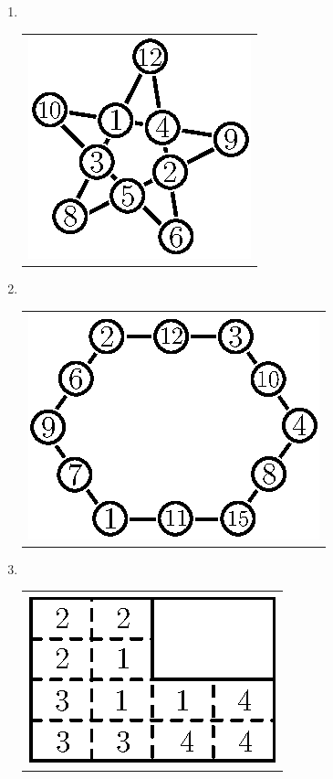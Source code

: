 \begin{enumerate}
\item 
~

  \vskip -0.5cm
  
\begin{tabular}[t]{c}
\centering
\includegraphics{src/figures/ans24.eps}
\end{tabular}

\bigskip
  \bigskip

\item 
~

  \vskip -0.6cm
  
\begin{tabular}[t]{c}
\centering
\includegraphics{src/figures/ans25.eps}
\end{tabular}

\bigskip
\bigskip

\item 
~

  \vskip -0.6cm
  
\begin{tabular}[t]{c}
\centering
\includegraphics{src/figures/ans26.eps}
\end{tabular}


\end{enumerate}
